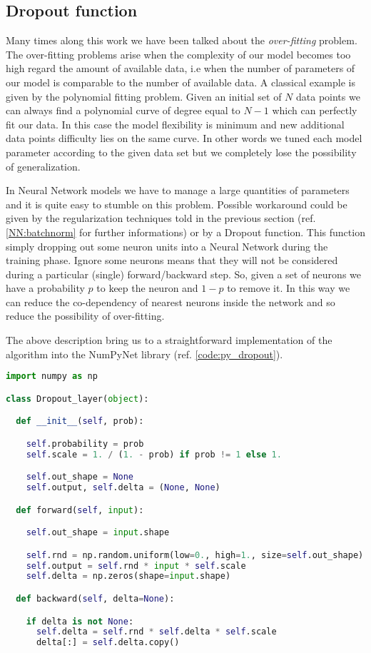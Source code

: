 \documentclass{standalone}
\begin{document}
\subsection[Dropout function]{Dropout function}\label{NN:dropout}

Many times along this work we have been talked about the \emph{over-fitting} problem.
The over-fitting problems arise when the complexity of our model becomes too high regard the amount of available data, i.e when the number of parameters of our model is comparable to the number of available data.
A classical example is given by the polynomial fitting problem.
Given an initial set of $N$ data points we can always find a polynomial curve of degree equal to $N-1$ which can perfectly fit our data.
In this case the model flexibility is minimum and new additional data points difficulty lies on the same curve.
In other words we tuned each model parameter according to the given data set but we completely lose the possibility of generalization.

In Neural Network models we have to manage a large quantities of parameters and it is quite easy to stumble on this problem.
Possible workaround could be given by the regularization techniques told in the previous section (ref. \ref{NN:batchnorm} for further informations) or by a Dropout function.
This function simply dropping out some neuron units into a Neural Network during the training phase.
Ignore some neurons means that they will not be considered during a particular (single) forward/backward step.
So, given a set of neurons we have a probability $p$ to keep the neuron and $1-p$ to remove it.
In this way we can reduce the co-dependency of nearest neurons inside the network and so reduce the possibility of over-fitting.

The above description bring us to a straightforward implementation of the algorithm into the NumPyNet library (ref. \ref{code:py_dropout}).

\lstset{style=snippet}
\begin{lstlisting}[language=Python, caption=NumPyNet version of Dropout function, label=code:py_dropout]
import numpy as np

class Dropout_layer(object):

  def __init__(self, prob):

    self.probability = prob
    self.scale = 1. / (1. - prob) if prob != 1 else 1.

    self.out_shape = None
    self.output, self.delta = (None, None)

  def forward(self, input):

    self.out_shape = input.shape

    self.rnd = np.random.uniform(low=0., high=1., size=self.out_shape) < self.probability
    self.output = self.rnd * input * self.scale
    self.delta = np.zeros(shape=input.shape)

  def backward(self, delta=None):

    if delta is not None:
      self.delta = self.rnd * self.delta * self.scale
      delta[:] = self.delta.copy()

\end{lstlisting}
\end{document}
